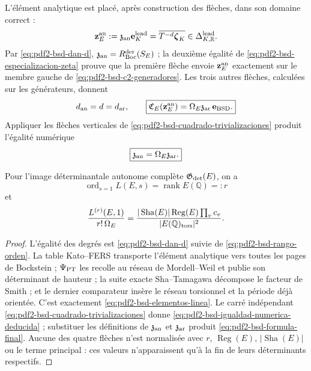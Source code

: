 L'élément analytique est placé, après construction des flèches, dans son
domaine correct :
\begin{equation}\label{eq:pdf2-bsd-elemento-analitico-tipado}
 \mathbf z_E^{\rm an}:=\mathfrak z_{\rm an}\mathbf e_K^{\rm lead}
 =\overline{T^{-d}\boldsymbol\zeta_K}
 \in\Delta_{K,\mathbb R}^{\rm lead}.
\end{equation}
Par \eqref{eq:pdf2-bsd-dan-d},
$\mathfrak z_{\rm an}=R_{\rm Boc}^{\rm der}(S_E)$ ; la deuxième égalité de
\eqref{eq:pdf2-bsd-especializacion-zeta} prouve que la première flèche envoie
$\mathbf z_E^{\rm an}$ exactement sur le membre gauche de
\eqref{eq:pdf2-bsd-c2-generadores}. Les trois autres flèches, calculées sur les
générateurs, donnent
\begin{equation}\label{eq:pdf2-bsd-elementos-linea}
 d_{\rm an}=d=d_{\rm ar},
 \qquad
 \boxed{
 \mathfrak C_E(\mathbf z_E^{\rm an})
 =\Omega_E\mathfrak z_{\rm ar}\,\mathbf e_{\rm BSD}.}
\end{equation}
Appliquer les flèches verticales de
\eqref{eq:pdf2-bsd-cuadrado-trivializaciones} produit l'égalité numérique
\begin{equation}\label{eq:pdf2-bsd-igualdad-numerica-deducida}
 \boxed{\mathfrak z_{\rm an}=\Omega_E\mathfrak z_{\rm ar}.}
\end{equation}

\begin{theorem}
\label{thm:pdf2-bsd-publicacion-final}
Pour l'image déterminantale autonome complète
$\mathfrak G_{\rm det}(E)$, on a
\begin{equation}\label{eq:pdf2-bsd-rango-final}
 \operatorname{ord}_{s=1}L(E,s)=\operatorname{rank}E(\mathbb Q)=:r
\end{equation}
et
\begin{equation}\label{eq:pdf2-bsd-formula-final}
 \frac{L^{(r)}(E,1)}{r!\,\Omega_E}
 =\frac{|\operatorname{Sha}(E)|\operatorname{Reg}(E)\prod_vc_v}
 {|E(\mathbb Q)_{\rm tors}|^2}.
\end{equation}
\end{theorem}

\begin{proof}
L'égalité des degrés est
\eqref{eq:pdf2-bsd-dan-d} suivie de
\eqref{eq:pdf2-bsd-rango-orden}. La table Kato--FERS transporte l'élément
analytique vers toutes les pages de Bockstein ; $\Psi_{\rm PT}$ les recolle au réseau
de Mordell--Weil et publie son déterminant de hauteur ; la suite exacte
Sha--Tamagawa décompose le facteur de Smith ; et le dernier comparateur insère
le réseau torsionnel et la période déjà orientée. C'est exactement
\eqref{eq:pdf2-bsd-elementos-linea}. Le carré indépendant
\eqref{eq:pdf2-bsd-cuadrado-trivializaciones} donne
\eqref{eq:pdf2-bsd-igualdad-numerica-deducida} ; substituer les définitions de
$\mathfrak z_{\rm an}$ et $\mathfrak z_{\rm ar}$ produit
\eqref{eq:pdf2-bsd-formula-final}. Aucune des quatre flèches n'est
normalisée avec $r$, $\operatorname{Reg}(E)$,
$|\operatorname{Sha}(E)|$ ou le terme principal : ces valeurs n'apparaissent
qu'à la fin de leurs déterminants respectifs.
\end{proof}

